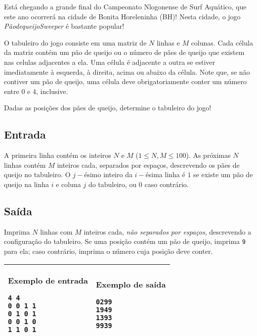 Está chegando a grande final do Campeonato Nlogonense de Surf Aquático, que este
ano ocorrerá na cidade de Bonita Horeleninha (BH)! Nesta cidade, o jogo
\textit{PãodequeijoSweeper} é bastante popular!

O tabuleiro do jogo consiste em uma matriz de $N$ linhas e $M$ colunas. Cada
célula da matriz contém um pão de queijo ou o número de pães de queijo que
existem nas celulas adjacentes a ela. Uma célula é adjacente a outra se estiver
imediatamente à esquerda, à direita, acima ou abaixo da célula. Note que, se não
contiver um pão de queijo, uma célula deve obrigatoriamente conter um número
entre $0$ e $4$, inclusive.

Dadas as posições dos pães de queijo, determine o tabuleiro do jogo!

\subsection*{Entrada}

A primeira linha contém os inteiros $N$ e $M$ ($1 \leq N, M \leq 100$). As
próximas $N$ linhas contém $M$ inteiros cada, separados por espaços, descrevendo
os pães de queijo no tabuleiro. O $j-$ésimo inteiro da $i-$ésima linha é $1$ se
existe um pão de queijo na linha $i$ e coluna $j$ do tabuleiro, ou $0$ caso
contrário.

\subsection*{Saída}

Imprima $N$ linhas com $M$ inteiros cada, \textit{não separados por espaços},
descrevendo a configuração do tabuleiro. Se uma posição contém um pão de queijo,
imprima \verb|9| para ela; caso contrário, imprima o número cuja posição deve
conter.

\begin{table}[!h]
\centering
\begin{tabular}{|l|l|}
\hline
\begin{minipage}[t]{3in}
\textbf{Exemplo de entrada}
\begin{verbatim}
4 4
0 0 1 1
0 1 0 1
0 0 1 0
1 1 0 1
\end{verbatim}
\vspace{1mm}
\end{minipage}
&

\begin{minipage}[t]{3in}
\textbf{Exemplo de saída}
\begin{verbatim}
0299
1949
1393
9939
\end{verbatim}
\vspace{1mm}
\end{minipage} \\
\hline
\end{tabular}
\end{table}

